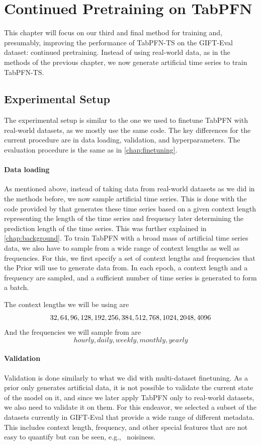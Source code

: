 \chapter{Continued Pretraining on TabPFN}
\label{chap:continuedpretraining}
This chapter will focus on our third and final method for training and, presumably, improving the performance of TabPFN-TS on the GIFT-Eval dataset: continued pretraining.
Instead of using real-world data, as in the methods of the previous chapter, we now generate artificial time series to train TabPFN-TS.
\section{Experimental Setup}
The experimental setup is similar to the one we used to finetune TabPFN with real-world datasets, as we mostly use the same code.
The key differences for the current procedure are in data loading, validation, and hyperparameters.
The evaluation procedure is the same as in \autoref{chap:finetuning}.
\subsubsection{Data loading}
As mentioned above, instead of taking data from real-world datasets as we did in the methods before, we now sample artificial time series.
This is done with the code provided by \citet{dooley2023forecastpfn} that generates these time series based on a given context length representing the length of the time series and frequency later determining the prediction length of the time series.
This was further explained in \autoref{chap:background}.
To train TabPFN with a broad mass of artificial time series data, we also have to sample from a wide range of context lengths as well as frequencies.
For this, we first specify a set of context lengths and frequencies that the Prior will use to generate data from.
In each epoch, a context length and a frequency are sampled, and a sufficient number of time series is generated to form a batch.

The context lengths we will be using are
\[32,\space 64,\space 96,\space 128,\space 192,\space 256,\space 384,\space 512,\space 768,\space 1024,\space 2048,\space 4096\]
And the frequencies we will sample from are
\[hourly, daily, weekly, monthly, yearly\]
\subsubsection{Validation}
Validation is done similarly to what we did with multi-dataset finetuning.
As a prior only generates artificial data, it is not possible to validate the current state of the model on it, and since we later apply TabPFN only to real-world datasets, we also need to validate it on them.
For this endeavor, we selected a subset of the datasets currently in GIFT-Eval that provide a wide range of different metadata.
This includes context length, frequency, and other special features that are not easy to quantify but can be seen, e.g., \ noisiness.

